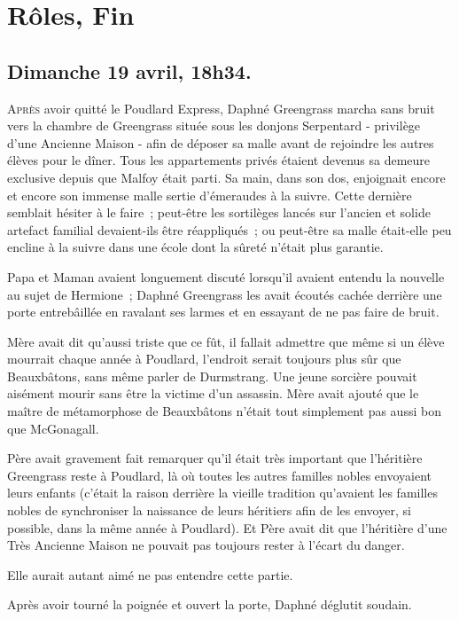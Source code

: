 \chapter{Rôles, Fin}

\section{Dimanche 19 avril, 18h34.}

\lettrine{A}{près} avoir quitté le Poudlard Express, Daphné Greengrass marcha sans bruit vers la chambre de Greengrass située sous les donjons Serpentard - privilège d'une Ancienne Maison - afin de déposer sa malle avant de rejoindre les autres élèves pour le dîner. Tous les appartements privés étaient devenus sa demeure exclusive depuis que Malfoy était parti. Sa main, dans son dos, enjoignait encore et encore son immense malle sertie d'émeraudes à la suivre. Cette dernière semblait hésiter à le faire~; peut-être les sortilèges lancés sur l'ancien et solide artefact familial devaient-ils être réappliqués~; ou peut-être sa malle était-elle peu encline à la suivre dans une école dont la sûreté n'était plus garantie.

Papa et Maman avaient longuement discuté lorsqu'il avaient entendu la nouvelle au sujet de Hermione~; Daphné Greengrass les avait écoutés cachée derrière une porte entrebâillée en ravalant ses larmes et en essayant de ne pas faire de bruit.

Mère avait dit qu'aussi triste que ce fût, il fallait admettre que même si un élève mourrait chaque année à Poudlard, l'endroit serait toujours plus sûr que Beauxbâtons, sans même parler de Durmstrang. Une jeune sorcière pouvait aisément mourir sans être la victime d'un assassin. Mère avait ajouté que le maître de métamorphose de Beauxbâtons n'était tout simplement pas aussi bon que McGonagall.

Père avait gravement fait remarquer qu'il était très important que l'héritière Greengrass reste à Poudlard, là où toutes les autres familles nobles envoyaient leurs enfants (c'était la raison derrière la vieille tradition qu'avaient les familles nobles de synchroniser la naissance de leurs héritiers afin de les envoyer, si possible, dans la même année à Poudlard). Et Père avait dit que l'héritière d'une Très Ancienne Maison ne pouvait pas toujours rester à l'écart du danger.

Elle aurait autant aimé ne pas entendre cette partie.

Après avoir tourné la poignée et ouvert la porte, Daphné déglutit soudain.

